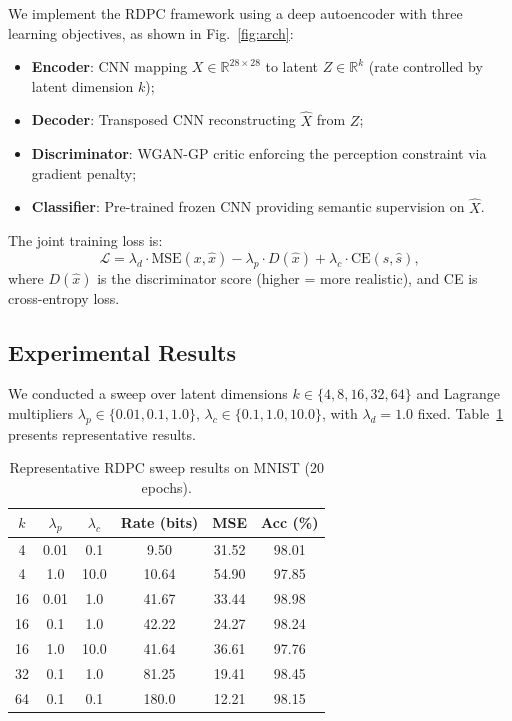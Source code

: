 \documentclass[conference]{IEEEtran}
\begin{document}
We implement the RDPC framework using a deep autoencoder with three learning objectives, as shown in Fig.~\ref{fig:arch}:
\begin{itemize}
    \item \textbf{Encoder}: CNN mapping $X \in \mathbb{R}^{28\times28}$ to latent $Z \in \mathbb{R}^k$ (rate controlled by latent dimension $k$);
    \item \textbf{Decoder}: Transposed CNN reconstructing $\hat{X}$ from $Z$;
    \item \textbf{Discriminator}: WGAN-GP critic enforcing the perception constraint via gradient penalty;
    \item \textbf{Classifier}: Pre-trained frozen CNN providing semantic supervision on $\hat{X}$.
\end{itemize}

The joint training loss is:
\begin{equation}
\mathcal{L} = \lambda_d \cdot \text{MSE}(x, \hat{x}) - \lambda_p \cdot D(\hat{x}) + \lambda_c \cdot \text{CE}(s, \hat{s}),
\end{equation}
where $D(\hat{x})$ is the discriminator score (higher = more realistic), and CE is cross-entropy loss.

\subsection{Experimental Results}

We conducted a sweep over latent dimensions $k \in \{4, 8, 16, 32, 64\}$ and Lagrange multipliers $\lambda_p \in \{0.01, 0.1, 1.0\}$, $\lambda_c \in \{0.1, 1.0, 10.0\}$, with $\lambda_d = 1.0$ fixed. Table~\ref{tab:sweep} presents representative results.

\begin{table}[htbp]
\caption{Representative RDPC sweep results on MNIST (20 epochs).}
\begin{center}
\begin{tabular}{cccccc}
\toprule
$k$ & $\lambda_p$ & $\lambda_c$ & Rate (bits) & MSE & Acc (\%) \\
\midrule
4  & 0.01 & 0.1  & 9.50  & 31.52 & 98.01 \\
4  & 1.0  & 10.0 & 10.64 & 54.90 & 97.85 \\
16 & 0.01 & 1.0  & 41.67 & 33.44 & 98.98 \\
16 & 0.1  & 1.0  & 42.22 & 24.27 & 98.24 \\
16 & 1.0  & 10.0 & 41.64 & 36.61 & 97.76 \\
32 & 0.1  & 1.0  & 81.25 & 19.41 & 98.45 \\
64 & 0.1  & 0.1  & 180.0 & 12.21 & 98.15 \\
\bottomrule
\end{tabular}
\label{tab:sweep}
\end{center}
\end{table}
\end{document}
